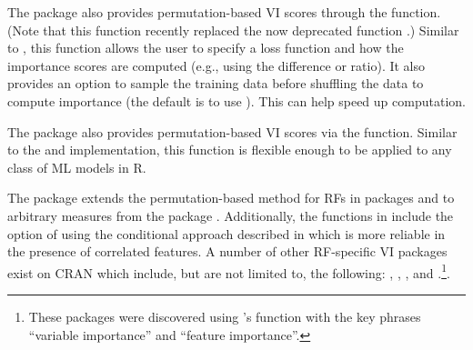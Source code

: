 The  package \citep{R-ingredients} also provides
permutation-based VI scores through the 
function. (Note that this function recently replaced the now deprecated
 function  \citep{R-DALEX}.)
Similar to , this function allows the user to
specify a loss function and how the importance scores are computed
(e.g., using the difference or ratio). It also provides an option to
sample the training data before shuffling the data to compute importance
(the default is to use ). This can help speed up
computation.

The  package \citep{R-mmpf} also provides
permutation-based VI scores via the
\newline {} function. Similar to the
 and  implementation, this function is
flexible enough to be applied to any class of ML models in R.

The  package \citep{R-varImp} extends the
permutation-based method for RFs in packages 
\citep{R-party} and  \citep{R-ranger} to arbitrary
measures from the  package \citep{R-measures}.
Additionally, the functions in  include the option of using
the conditional approach described in \citet{strobl-2019-conditional}
which is more reliable in the presence of correlated features. A number
of other RF-specific VI packages exist on CRAN which include, but are
not limited to, the following:  \citep{R-vita},
 \citep{R-rfVarImpOOB},
 \citep{R-randomForestExplainer}, and
 \citep{R-tree.interpreter}.\footnote{These
  packages were discovered using 's 
  function \citep{R-pkgsearch} with the key phrases ``variable
  importance'' and ``feature importance''.}.

